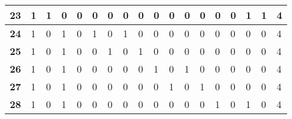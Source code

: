 \begin{center}
\begin{longtable}{|P{0.3cm}|P{0.3cm}|P{0.3cm}|P{0.3cm}|P{0.3cm}|P{0.3cm}|P{0.3cm}|P{0.3cm}|P{0.3cm}|P{0.3cm}|P{0.3cm}|P{0.3cm}|P{0.3cm}|P{0.3cm}|P{0.3cm}|P{0.3cm}|P{0.3cm}|P{1.4cm}|}
\textbf{23}                        & 1                     & 1                     & 0                     & 0                     & 0                     & 0                     & 0                     & 0                     & 0                     & 0                     & 0                     & 0                     & 0                     & 0                     & 1                     & 1                     & 4                     \\ \hline
\textbf{24}                        & 1                     & 0                     & 1                     & 0                     & 1                     & 0                     & 1                     & 0                     & 0                     & 0                     & 0                     & 0                     & 0                     & 0                     & 0                     & 0                     & 4                     \\ \hline
\textbf{25}                        & 1                     & 0                     & 1                     & 0                     & 0                     & 1                     & 0                     & 1                     & 0                     & 0                     & 0                     & 0                     & 0                     & 0                     & 0                     & 0                     & 4                     \\ \hline
\textbf{26}                        & 1                     & 0                     & 1                     & 0                     & 0                     & 0                     & 0                     & 0                     & 1                     & 0                     & 1                     & 0                     & 0                     & 0                     & 0                     & 0                     & 4                     \\ \hline
\textbf{27}                        & 1                     & 0                     & 1                     & 0                     & 0                     & 0                     & 0                     & 0                     & 0                     & 1                     & 0                     & 1                     & 0                     & 0                     & 0                     & 0                     & 4                     \\ \hline
\textbf{28}                        & 1                     & 0                     & 1                     & 0                     & 0                     & 0                     & 0                     & 0                     & 0                     & 0                     & 0                     & 0                     & 1                     & 0                     & 1                     & 0                     & 4                     \\ \hline

\end{longtable}
\end{center}
